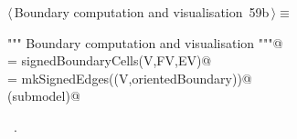 \documentclass[11pt,oneside]{article}    %
\begin{document}
\begin{flushleft} \small \label{scrap115}
\protect{}$\langle\,$Boundary computation and visualisation\nobreak\ {\footnotesize 59b}$\,\rangle\equiv$
\vspace{-1ex}
\begin{list}{}{} \item
\mbox{}\verb@""" Boundary computation and visualisation """@\\
\mbox{}\verb@orientedBoundary = signedBoundaryCells(V,FV,EV)@\\
\mbox{}\verb@submodel = mkSignedEdges((V,orientedBoundary))@\\
\mbox{}\verb@VIEW(submodel)@\\
\mbox{}\verb@@{\NWsep}
\end{list}
\vspace{-1ex}
\footnotesize\addtolength{\baselineskip}{-1ex}
\begin{list}{}{\setlength{\itemsep}{-\parsep}\setlength{\itemindent}{-\leftmargin}}
\item \NWtxtMacroRefIn\ .
\end{list}
\end{flushleft}
\end{document}
